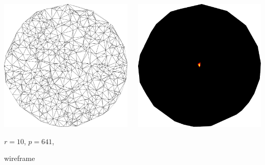 \documentclass[aspectratio=169,t]{beamer}
\begin{document}
{\begin{columns}
\begin{column}{0.22\textwidth}
			\includegraphics[width=.85\textwidth]{data/synthetic_meshes/random_circle_tessellation_Dirac_delta_10_v641_f1252_wireframe.png}
			{\footnotesize
				\par \vspace{-1mm} $r=10$, $p=641$,
				\par \vspace{-1mm} wireframe
			}
		\end{column}
		\begin{column}{0.22\textwidth}
			\centering
			\includegraphics[width=.85\textwidth]{data/synthetic_meshes/random_circle_tessellation_Dirac_delta_10_v641_f1252_funcvals_0iter.png}

\end{column}
\end{columns}}
\end{document}
